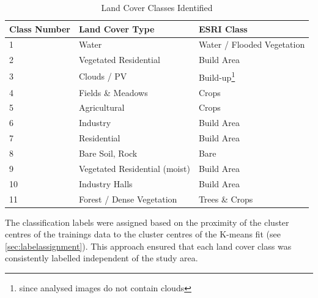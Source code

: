 \documentclass[12pt,a4paper, english,twoside]{article}
\begin{document}
      \begin{table}[ht]
      \centering
      \renewcommand{\arraystretch}{1.4}
      \caption{Land Cover Classes Identified\label{tab:land_cover_classes}}
      \begin{tabular}{p{1cm}p{4cm} l }
      \toprule
      \textbf{Class Number} & \textbf{Land Cover Type} & \textbf{ESRI Class}\\
      \midrule
      1 &   Water                         & Water / Flooded Vegetation\\
      2 &   Vegetated Residential         & Build Area\\
      3 &   Clouds / PV                   & Build-up\footnote{since analysed images do not contain clouds} \\
      4 &   Fields \& Meadows             & Crops\\
      5 &   Agricultural                  & Crops\\
      6 &   Industry                      & Build Area\\
      7 &   Residential                   & Build Area\\
      8 &   Bare Soil, Rock               & Bare \\
      9 &   Vegetated Residential (moist) & Build Area\\
      10 &  Industry Halls                & Build Area\\
      11 &  Forest / Dense Vegetation     & Trees \& Crops \\
      \bottomrule
      \end{tabular}
      \end{table}


      \noindent
      The classification labels were assigned based on the proximity of the cluster centres of the trainings data to the cluster centres of the K-means fit (see \cref{sec:labelassignment}).
      This approach ensured that each land cover class was consistently labelled independent of the study area.\\
\end{document}
